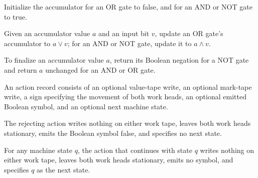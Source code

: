 \begin{definition}
\label{BoolCircuit.CircuitEval.accInit}
\leanok
{}
Initialize the accumulator for an OR gate to false, and for an AND or NOT gate to true.
\end{definition}

\begin{definition}
\label{BoolCircuit.CircuitEval.accComb}
\leanok
{}
Given an accumulator value $a$ and an input bit $v$, update an OR gate’s accumulator to
$a \lor v$; for an AND or NOT gate, update it to $a \land v$.
\end{definition}

\begin{definition}
\label{BoolCircuit.CircuitEval.accFin}
\leanok
{}
To finalize an accumulator value $a$, return its Boolean negation for a NOT gate and
return $a$ unchanged for an AND or OR gate.
\end{definition}

\begin{definition}
\label{BoolCircuit.CircuitEval.LA}
\leanok
{}
An action record consists of an optional value-tape write, an optional mark-tape write,
a sign specifying the movement of both work heads, an optional emitted Boolean symbol,
and an optional next machine state.
\end{definition}

\begin{definition}
\label{BoolCircuit.CircuitEval.LA.rej}
\leanok
{}
The rejecting action writes nothing on either work tape, leaves both work heads
stationary, emits the Boolean symbol false, and specifies no next state.
\end{definition}

\begin{definition}
\label{BoolCircuit.CircuitEval.LA.go}
\leanok
{}
For any machine state $q$, the action that continues with state $q$ writes nothing on
either work tape, leaves both work heads stationary, emits no symbol, and specifies $q$
as the next state.
\end{definition}

